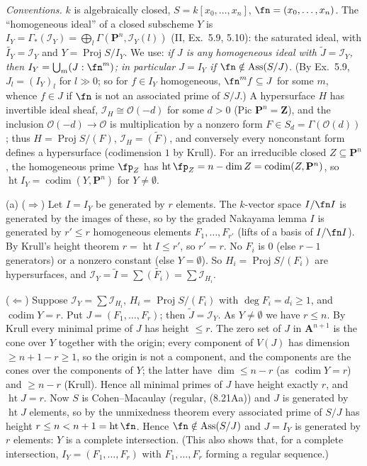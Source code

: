 \documentclass[11pt]{article}
\begin{document}
\emph{Conventions.} $k$ is algebraically closed, $S=k[x_0,\dots,x_n]$, $\fn=(x_0,\dots,x_n)$. The ``homogeneous ideal'' of a closed subscheme $Y$ is $I_Y=\Gamma_*(\mathcal I_Y)=\bigoplus_l\Gamma(\mathbf P^n,\mathcal I_Y(l))$ (II, Ex.~5.9, 5.10): the saturated ideal, with $\widetilde{I_Y}=\mathcal I_Y$ and $Y=\operatorname{Proj}S/I_Y$. We use: \emph{if $J$ is any homogeneous ideal with $\widetilde J=\mathcal I_Y$, then $I_Y=\bigcup_m(J:\fn^m)$; in particular $J=I_Y$ if $\fn\notin\operatorname{Ass}(S/J)$.} (By Ex.~5.9, $J_l=(I_Y)_l$ for $l\gg0$; so for $f\in I_Y$ homogeneous, $\fn^mf\subseteq J$ for some $m$, whence $f\in J$ if $\fn$ is not an associated prime of $S/J$.) A hypersurface $H$ has invertible ideal sheaf, $\mathcal I_H\cong\mathcal O(-d)$ for some $d>0$ (Pic $\mathbf P^n=\mathbf Z$), and the inclusion $\mathcal O(-d)\to\mathcal O$ is multiplication by a nonzero form $F\in S_d=\Gamma(\mathcal O(d))$; thus $H=\operatorname{Proj}S/(F)$, $\mathcal I_H=\widetilde{(F)}$, and conversely every nonconstant form defines a hypersurface (codimension $1$ by Krull). For an irreducible closed $Z\subseteq\mathbf P^n$, the homogeneous prime $\fp_Z$ has $\operatorname{ht}\fp_Z=n-\dim Z=\operatorname{codim}(Z,\mathbf P^n)$, so $\operatorname{ht}I_Y=\operatorname{codim}(Y,\mathbf P^n)$ for $Y\ne\emptyset$.

(a) ($\Rightarrow$) Let $I=I_Y$ be generated by $r$ elements. The $k$-vector space $I/\fn I$ is generated by the images of these, so by the graded Nakayama lemma $I$ is generated by $r'\le r$ homogeneous elements $F_1,\dots,F_{r'}$ (lifts of a basis of $I/\fn I$). By Krull's height theorem $r=\operatorname{ht}I\le r'$, so $r'=r$. No $F_i$ is $0$ (else $r-1$ generators) or a nonzero constant (else $Y=\emptyset$). So $H_i=\operatorname{Proj}S/(F_i)$ are hypersurfaces, and $\mathcal I_Y=\widetilde I=\sum\widetilde{(F_i)}=\sum\mathcal I_{H_i}$.

($\Leftarrow$) Suppose $\mathcal I_Y=\sum\mathcal I_{H_i}$, $H_i=\operatorname{Proj}S/(F_i)$ with $\deg F_i=d_i\geq 1$, and $\operatorname{codim}Y=r$. Put $J=(F_1,\dots,F_r)$; then $\widetilde J=\mathcal I_Y$. As $Y\ne\emptyset$ we have $r\le n$. By Krull every minimal prime of $J$ has height $\le r$. The zero set of $J$ in $\mathbf A^{n+1}$ is the cone over $Y$ together with the origin; every component of $V(J)$ has dimension $\ge n+1-r\ge1$, so the origin is not a component, and the components are the cones over the components of $Y$; the latter have $\dim\le n-r$ (as $\operatorname{codim}Y=r$) and $\ge n-r$ (Krull). Hence all minimal primes of $J$ have height exactly $r$, and $\operatorname{ht}J=r$. Now $S$ is Cohen--Macaulay (regular, (8.21Aa)) and $J$ is generated by $\operatorname{ht}J$ elements, so by the unmixedness theorem every associated prime of $S/J$ has height $r\le n<n+1=\operatorname{ht}\fn$. Hence $\fn\notin\operatorname{Ass}(S/J)$ and $J=I_Y$ is generated by $r$ elements: $Y$ is a complete intersection. (This also shows that, for a complete intersection, $I_Y=(F_1,\dots,F_r)$ with $F_1,\dots,F_r$ forming a regular sequence.)
\end{document}
